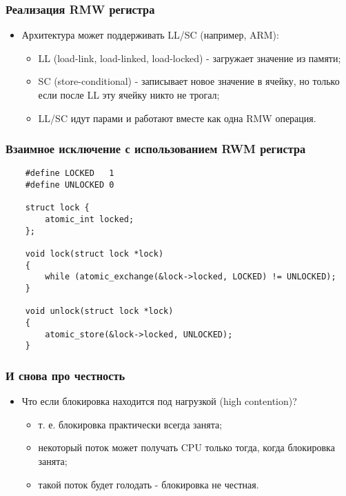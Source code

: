\begin{frame}
\frametitle{Реализация RMW регистра}
\begin{itemize}
    \item<1->Архитектура может поддерживать LL/SC (например, ARM):
    \begin{itemize}
        \item<2->LL (load-link, load-linked, load-locked) - загружает значение
             из памяти;
        \item<3->SC (store-conditional) - записывает новое значение в ячейку,
             но только если после LL эту ячейку никто не трогал;
        \item<4->LL/SC идут парами и работают вместе как одна RMW операция.
    \end{itemize}
\end{itemize}
\end{frame}

\begin{frame}[fragile]
\frametitle{Взаимное исключение с использованием RWM регистра}
\begin{lstlisting}
    #define LOCKED   1
    #define UNLOCKED 0

    struct lock {
        atomic_int locked;
    };

    void lock(struct lock *lock)
    {
        while (atomic_exchange(&lock->locked, LOCKED) != UNLOCKED);
    }

    void unlock(struct lock *lock)
    {
        atomic_store(&lock->locked, UNLOCKED);
    }
\end{lstlisting}
\end{frame}

\begin{frame}
\frametitle{И снова про честность}
\begin{itemize}
    \item<1->Что если блокировка находится под нагрузкой (high contention)?
    \begin{itemize}
        \item<2->т. е. блокировка практически всегда занята;
        \item<3->некоторый поток может получать CPU только тогда, когда
             блокировка занята;
        \item<4->такой поток будет голодать - блокировка не честная.
    \end{itemize}
\end{itemize}
\end{frame}

